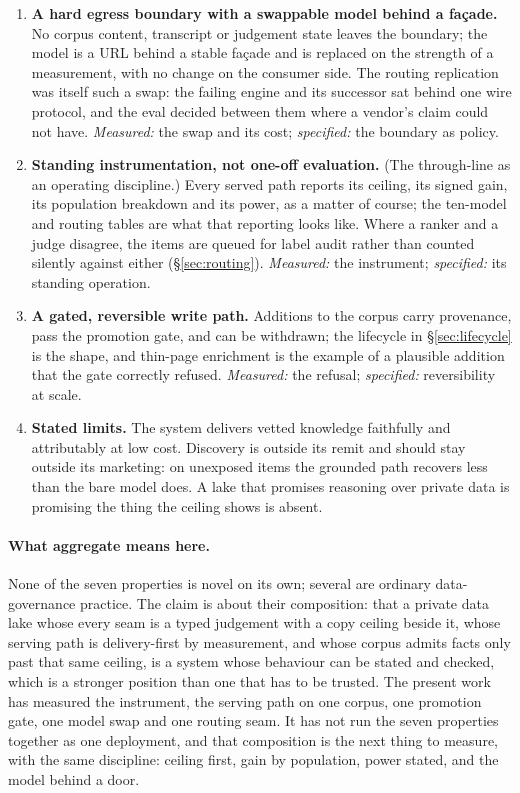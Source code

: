 \begin{enumerate}[topsep=2pt,itemsep=3pt,leftmargin=2em,label=\textbf{D\arabic*}]
\item \textbf{A hard egress boundary with a swappable model behind a façade.} No corpus content, transcript or judgement state leaves the boundary; the model is a URL behind a stable façade and is replaced on the strength of a measurement, with no change on the consumer side. The routing replication was itself such a swap: the failing engine and its successor sat behind one wire protocol, and the eval decided between them where a vendor's claim could not have. \emph{Measured:} the swap and its cost; \emph{specified:} the boundary as policy.
\item \textbf{Standing instrumentation, not one-off evaluation.} (The through-line as an operating discipline.) Every served path reports its ceiling, its signed gain, its population breakdown and its power, as a matter of course; the ten-model and routing tables are what that reporting looks like. Where a ranker and a judge disagree, the items are queued for label audit rather than counted silently against either (\S\ref{sec:routing}). \emph{Measured:} the instrument; \emph{specified:} its standing operation.
\item \textbf{A gated, reversible write path.} Additions to the corpus carry provenance, pass the promotion gate, and can be withdrawn; the lifecycle in \S\ref{sec:lifecycle} is the shape, and thin-page enrichment is the example of a plausible addition that the gate correctly refused. \emph{Measured:} the refusal; \emph{specified:} reversibility at scale.
\item \textbf{Stated limits.} The system delivers vetted knowledge faithfully and attributably at low cost. Discovery is outside its remit and should stay outside its marketing: on unexposed items the grounded path recovers less than the bare model does. A lake that promises reasoning over private data is promising the thing the ceiling shows is absent.
\end{enumerate}

\paragraph{What aggregate means here.} None of the seven properties is novel on its own; several are ordinary data-governance practice. The claim is about their composition: that a private data lake whose every seam is a typed judgement with a copy ceiling beside it, whose serving path is delivery-first by measurement, and whose corpus admits facts only past that same ceiling, is a system whose behaviour can be stated and checked, which is a stronger position than one that has to be trusted. The present work has measured the instrument, the serving path on one corpus, one promotion gate, one model swap and one routing seam. It has not run the seven properties together as one deployment, and that composition is the next thing to measure, with the same discipline: ceiling first, gain by population, power stated, and the model behind a door.
